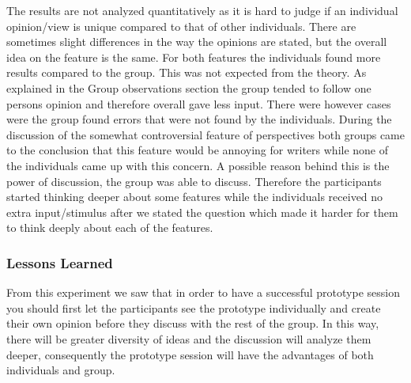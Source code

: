 \documentclass[main.tex]{subfiles}
\begin{document}
The results are not analyzed quantitatively as it is hard to judge if an individual opinion/view is unique compared to that of other individuals. There are sometimes slight differences in the way the opinions are stated, but the overall idea on the feature is the same. For both features the individuals found more results compared to the group. This was not expected from the theory. As explained in the Group observations section the group tended to follow one persons opinion and therefore overall gave less input. There were however cases were the group found errors that were not found by the individuals. During the discussion of the somewhat controversial feature of perspectives both groups came to the conclusion that this feature would be annoying for writers while none of the individuals came up with this concern. A possible reason behind this is the power of discussion, the group was able to discuss. Therefore the participants started thinking deeper about some features while the individuals received no extra input/stimulus after we stated the question which made it harder for them to think deeply about each of the features.

\subsubsection{Lessons Learned}
From this experiment we saw that in order to have a successful prototype session you should first let the participants see the prototype individually and create their own opinion before they discuss with the rest of the group. In this way, there will be greater diversity of ideas and the discussion will analyze them deeper, consequently the prototype session will have the advantages of both individuals and group.
\end{document}
